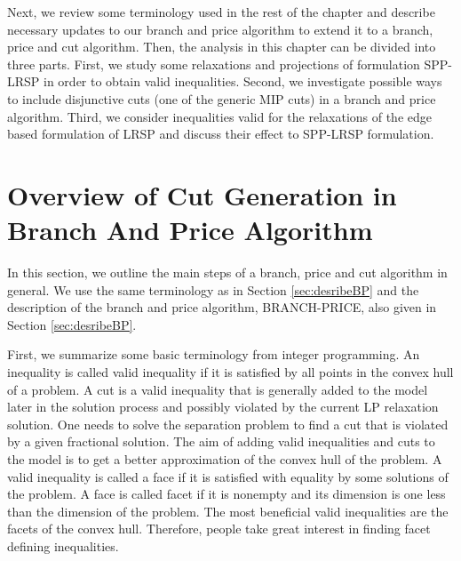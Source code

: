 Next, we review some terminology used in the rest of the chapter and
describe necessary updates to our branch and price algorithm to
extend it to a branch, price and cut algorithm. Then, the analysis in
this chapter can be divided into three parts. First, we
study some relaxations and projections of formulation SPP-LRSP
in order to obtain valid inequalities. Second, we investigate
possible ways to include disjunctive cuts (one of the generic
MIP cuts) in a branch and price algorithm. Third, we consider
inequalities valid for the relaxations of the edge based formulation
of LRSP and discuss their effect to SPP-LRSP formulation.

\section{Overview of Cut Generation in Branch And Price Algorithm}
In this section, we outline the main steps of a branch, price and
cut algorithm in general. We use the same terminology as in Section
\ref{sec:desribeBP} and the description of the branch and price
algorithm, BRANCH-PRICE, also given in Section \ref{sec:desribeBP}.

First, we summarize some basic terminology from integer programming.
An inequality is called valid inequality if it is satisfied by all points
in the convex hull of a problem. A cut is a valid inequality that is
generally added to the model later in the solution process and possibly
violated by the current LP relaxation solution. One needs to solve the
separation problem to find a cut that is violated by a given fractional
solution. The aim of adding valid inequalities and cuts to the model is
to get a better approximation of the convex hull of the problem.
A valid inequality is called a face if it is satisfied with equality by
some solutions of the problem. A face is called facet if it is nonempty and
its dimension is one less than the dimension of the problem. The most beneficial
valid inequalities are the facets of the convex hull. Therefore,
people take great interest in finding facet defining inequalities.

